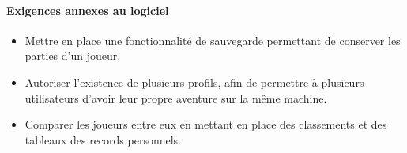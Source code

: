 \paragraph{Exigences annexes au logiciel}
\begin{itemize}
    \item Mettre en place une fonctionnalité de sauvegarde permettant de conserver les parties d'un joueur.
    \item Autoriser l'existence de plusieurs profils, afin de permettre à plusieurs utilisateurs d'avoir leur propre aventure sur la même machine.
    \item Comparer les joueurs entre eux en mettant en place des classements et des tableaux des records personnels.
\end{itemize}
